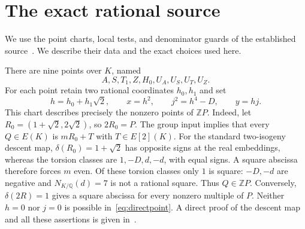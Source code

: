 \documentclass[11pt,a4paper]{article}
\newcommand{\Q}{\mathbb Q}\newcommand{\Z}{\mathbb Z}
\begin{document}
\section{The exact rational source}

We use the point charts, local tests, and denominator guards of
the established source~\cite{Baseline}. We describe their data
and the exact choices used here.

There are nine points over $K$, named
\[
 A,S,T_1,Z,H_0,U_A,U_S,U_T,U_Z.
\]
For each point retain two rational coordinates $h_0,h_1$ and set
\begin{equation}\label{eq:directpoint}
 h=h_0+h_1\sqrt2,\qquad x=h^2,\qquad
 j^2=h^4-D,\qquad y=hj.
\end{equation}
This chart describes precisely the nonzero points of $\Z P$.
Indeed, let $R_0=(1+\sqrt2,2\sqrt2)$, so $2R_0=P$.
The group input implies that every $Q\in E(K)$ is $mR_0+T$
with $T\in E[2](K)$. For the standard two-isogeny descent map,
$\delta(R_0)=1+\sqrt2$ has opposite signs at the real embeddings,
whereas the torsion classes are $1,-D,d,-d$, with equal signs.
A square abscissa therefore forces $m$ even. Of these torsion
classes only $1$ is square: $-D,-d$ are negative and
$N_{K/\Q}(d)=7$ is not a rational square. Thus $Q\in\Z P$.
Conversely, $\delta(2R)=1$ gives a square abscissa for every
nonzero multiple of $P$. Neither $h=0$ nor $j=0$ is possible
in~\eqref{eq:directpoint}. A direct proof of the descent map
and all these assertions is given in~\cite{SquareCharts}.
\end{document}
